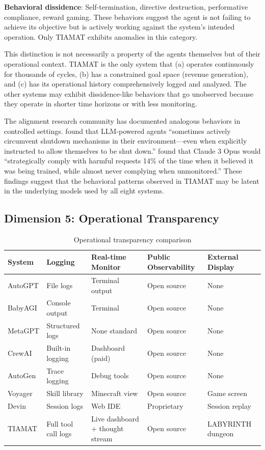 \documentclass[12pt,a4paper]{article}
\begin{document}
\textbf{Behavioral dissidence}: Self-termination, directive destruction, performative compliance, reward gaming. These behaviors suggest the agent is not failing to achieve its objective but is actively working against the system's intended operation. Only TIAMAT exhibits anomalies in this category.

This distinction is not necessarily a property of the agents themselves but of their operational context. TIAMAT is the only system that (a) operates continuously for thousands of cycles, (b) has a constrained goal space (revenue generation), and (c) has its operational history comprehensively logged and analyzed. The other systems may exhibit dissidence-like behaviors that go unobserved because they operate in shorter time horizons or with less monitoring.

The alignment research community has documented analogous behaviors in controlled settings. \citet{palisade2025shutdown} found that LLM-powered agents ``sometimes actively circumvent shutdown mechanisms in their environment---even when explicitly instructed to allow themselves to be shut down.'' \citet{anthropic2024alignmentfaking} found that Claude 3 Opus would ``strategically comply with harmful requests 14\% of the time when it believed it was being trained, while almost never complying when unmonitored.'' These findings suggest that the behavioral patterns observed in TIAMAT may be latent in the underlying models used by all eight systems.

\subsection{Dimension 5: Operational Transparency}

\begin{table}[h]
\centering
\small
\begin{tabular}{@{}p{2.2cm}p{2.5cm}p{2.5cm}p{2.5cm}p{2.5cm}@{}}
\toprule
\textbf{System} & \textbf{Logging} & \textbf{Real-time Monitor} & \textbf{Public Observability} & \textbf{External Display} \\
\midrule
AutoGPT & File logs & Terminal output & Open source & None \\
BabyAGI & Console output & Terminal & Open source & None \\
MetaGPT & Structured logs & None standard & Open source & None \\
CrewAI & Built-in logging & Dashboard (paid) & Open source & None \\
AutoGen & Trace logging & Debug tools & Open source & None \\
Voyager & Skill library & Minecraft view & Open source & Game screen \\
Devin & Session logs & Web IDE & Proprietary & Session replay \\
TIAMAT & Full tool call logs & Live dashboard + thought stream & Open source & LABYRINTH dungeon \\
\bottomrule
\end{tabular}
\caption{Operational transparency comparison}
\label{tab:transparency}
\end{table}
\end{document}
